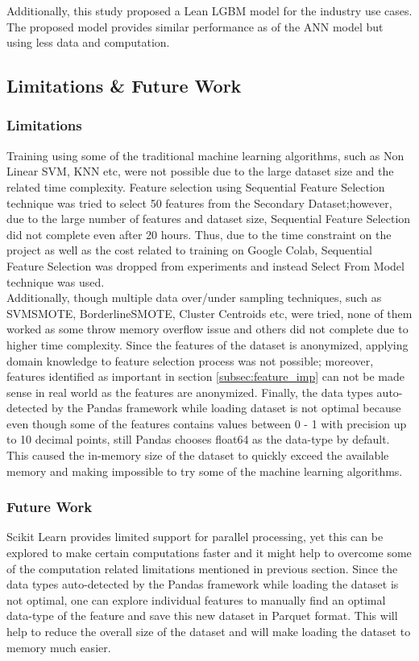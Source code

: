 \documentclass[twoside,11pt,a4paper]{article}
\begin{document}
Additionally, this study proposed a Lean \acs{LGBM} model for the industry use cases. The proposed model provides similar performance as of the \acs{ANN} model but using less data and computation.

\subsection{Limitations \& Future Work}

\subsubsection{Limitations}
Training using some of the traditional machine learning algorithms, such as Non Linear \acs{SVM}, \acf{KNN} etc, were not possible due to the large dataset size and the related time complexity. Feature selection using Sequential Feature Selection technique was tried to select 50 features from the Secondary Dataset;however, due to the large number of features and dataset size, Sequential Feature Selection did not complete even after 20 hours. Thus, due to the time constraint on the project as well as the cost related to training on Google Colab, Sequential Feature Selection was dropped from experiments and instead Select From Model technique was used.\\

Additionally, though multiple data over/under sampling techniques, such as SVMSMOTE, BorderlineSMOTE, Cluster Centroids etc,  were tried, none of them worked as some throw memory overflow issue and others did not complete due to higher time complexity. Since the features of the dataset is anonymized, applying domain knowledge to feature selection process was not possible; moreover, features identified as important in section \ref{subsec:feature_imp} can not be made sense in real world as the features are anonymized. 
Finally, the  data types auto-detected by the Pandas framework while loading dataset is not optimal because even though some of the features contains values between 0 - 1 with precision up to 10 decimal points, still Pandas chooses float64 as the data-type by default. This caused the in-memory size of the dataset to quickly exceed the available memory and making impossible to try some of the machine learning algorithms.

\subsubsection{Future Work}
Scikit Learn \citep{scikit-learn} provides limited support for parallel processing, yet this can be explored to make certain computations faster and it might help to overcome some of the computation related limitations mentioned in previous section. Since the data types auto-detected by the Pandas framework while loading the dataset is not optimal, one can explore individual features to manually find an optimal data-type of the feature and save this new dataset in Parquet format. This will help to reduce the overall size of the dataset and will make loading the dataset to memory much easier.
\end{document}
